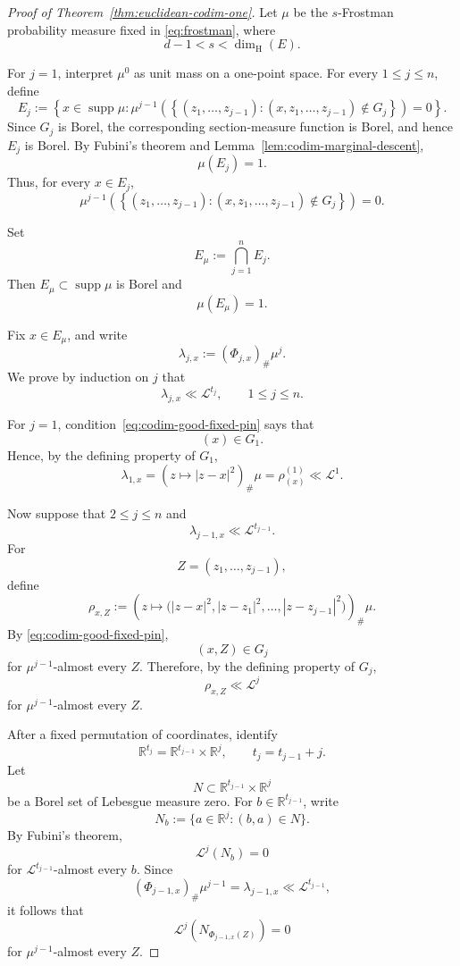 \documentclass[11pt]{article}
\theoremstyle{remark}
\newcommand{\R}{\mathbb R}
\newcommand{\cL}{\mathcal L}
\newcommand{\supp}{\operatorname{supp}}
\numberwithin{equation}{section}
\newcommand{\1}{\mathbf 1}
\begin{document}
\begin{proof}[Proof of Theorem~\ref{thm:euclidean-codim-one}]
Let \(\mu\) be the \(s\)-Frostman probability measure fixed in
\eqref{eq:frostman}, where
\[
d-1<s<\dim_{\mathrm H}(E).
\]

For \(j=1\), interpret \(\mu^0\) as unit mass on a one-point space.
For every \(1\leq j\leq n\), define
\[
E_j
:=
\left\{
x\in\supp\mu:
\mu^{j-1}
\left(
\left\{
(z_1,\ldots,z_{j-1}):
(x,z_1,\ldots,z_{j-1})\notin G_j
\right\}
\right)
=0
\right\}.
\]
Since \(G_j\) is Borel, the corresponding section-measure function is
Borel, and hence \(E_j\) is Borel. By Fubini's theorem and
Lemma~\ref{lem:codim-marginal-descent},
\[
\mu(E_j)=1.
\]
Thus, for every \(x\in E_j\),
\begin{equation}
\mu^{j-1}
\left(
\left\{
(z_1,\ldots,z_{j-1}):
(x,z_1,\ldots,z_{j-1})\notin G_j
\right\}
\right)
=0.
\label{eq:codim-good-fixed-pin}
\end{equation}

Set
\[
E_\mu
:=
\bigcap_{j=1}^n E_j.
\]
Then \(E_\mu\subset\supp\mu\) is Borel and
\[
\mu(E_\mu)=1.
\]

Fix \(x\in E_\mu\), and write
\[
\lambda_{j,x}
:=
(\Phi_{j,x})_\#\mu^j.
\]
We prove by induction on \(j\) that
\[
\lambda_{j,x}\ll\cL^{t_j},
\qquad 1\leq j\leq n.
\]

For \(j=1\), condition~\eqref{eq:codim-good-fixed-pin} says that
\[
(x)\in G_1.
\]
Hence, by the defining property of \(G_1\),
\[
\lambda_{1,x}
=
\left(
z\longmapsto |z-x|^2
\right)_\#\mu
=
\rho^{(1)}_{(x)}
\ll\cL^1.
\]

Now suppose that \(2\leq j\leq n\) and
\[
\lambda_{j-1,x}\ll\cL^{t_{j-1}}.
\]
For
\[
Z=(z_1,\ldots,z_{j-1}),
\]
define
\[
\rho_{x,Z}
:=
\left(
z\longmapsto
\bigl(
|z-x|^2,
|z-z_1|^2,
\ldots,
|z-z_{j-1}|^2
\bigr)
\right)_\#\mu.
\]
By \eqref{eq:codim-good-fixed-pin},
\[
(x,Z)\in G_j
\]
for \(\mu^{j-1}\)-almost every \(Z\). Therefore, by the defining
property of \(G_j\),
\[
\rho_{x,Z}\ll\cL^j
\]
for \(\mu^{j-1}\)-almost every \(Z\).

After a fixed permutation of coordinates, identify
\[
\R^{t_j}
=
\R^{t_{j-1}}\times\R^j,
\qquad
t_j=t_{j-1}+j.
\]
Let
\[
N\subset\R^{t_{j-1}}\times\R^j
\]
be a Borel set of Lebesgue measure zero. For
\(b\in\R^{t_{j-1}}\), write
\[
N_b
:=
\{a\in\R^j:(b,a)\in N\}.
\]
By Fubini's theorem,
\[
\cL^j(N_b)=0
\]
for \(\cL^{t_{j-1}}\)-almost every \(b\). Since
\[
(\Phi_{j-1,x})_\#\mu^{j-1}
=
\lambda_{j-1,x}
\ll\cL^{t_{j-1}},
\]
it follows that
\[
\cL^j
\left(
N_{\Phi_{j-1,x}(Z)}
\right)
=0
\]
for \(\mu^{j-1}\)-almost every \(Z\).


\end{proof}
\end{document}
